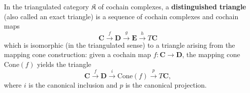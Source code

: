 In the triangulated category $\mathfrak{K}$ of cochain complexes, a \textbf{distinguished triangle} (also called an exact triangle) is a sequence of cochain complexes and cochain maps
$$
\mathbf{C} \xrightarrow{f} \mathbf{D} \xrightarrow{g} \mathbf{E} \xrightarrow{h} T\mathbf{C}
$$
which is isomorphic (in the triangulated sense) to a triangle arising from the mapping cone construction: given a cochain map $f: \mathbf{C} \to \mathbf{D}$, the mapping cone $\mathrm{Cone}(f)$ yields the triangle
$$
\mathbf{C} \xrightarrow{f} \mathbf{D} \xrightarrow{i} \mathrm{Cone}(f) \xrightarrow{p} T\mathbf{C},
$$
where $i$ is the canonical inclusion and $p$ is the canonical projection.
